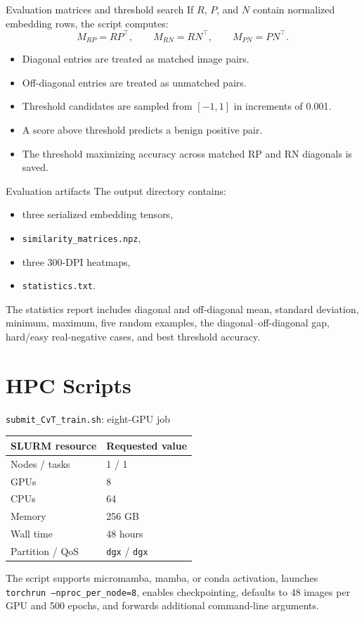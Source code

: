 \documentclass[aspectratio=169,10pt]{beamer}
\newcommand{\file}[1]{\texttt{#1}}
\newcommand{\code}[1]{\texttt{#1}}
\begin{document}
\begin{frame}{Evaluation matrices and threshold search}
  If $R$, $P$, and $N$ contain normalized embedding rows, the script computes:
  \[
    M_{RP}=RP^\top,\qquad
    M_{RN}=RN^\top,\qquad
    M_{PN}=PN^\top.
  \]
  \begin{itemize}
    \item Diagonal entries are treated as matched image pairs.
    \item Off-diagonal entries are treated as unmatched pairs.
    \item Threshold candidates are sampled from $[-1,1]$ in increments of 0.001.
    \item A score above threshold predicts a benign positive pair.
    \item The threshold maximizing accuracy across matched RP and RN diagonals is saved.
  \end{itemize}
\end{frame}

\begin{frame}{Evaluation artifacts}
  The output directory contains:
  \begin{itemize}
    \item three serialized embedding tensors,
    \item \file{similarity\_matrices.npz},
    \item three 300-DPI heatmaps,
    \item \file{statistics.txt}.
  \end{itemize}
  The statistics report includes diagonal and off-diagonal mean, standard
  deviation, minimum, maximum, five random examples, the diagonal--off-diagonal
  gap, hard/easy real-negative cases, and best threshold accuracy.
\end{frame}

\section{HPC Scripts}

\begin{frame}{\file{submit\_CvT\_train.sh}: eight-GPU job}
  \centering
  \begin{tabular}{ll}
    \toprule
    SLURM resource & Requested value\\
    \midrule
    Nodes / tasks & 1 / 1\\
    GPUs & 8\\
    CPUs & 64\\
    Memory & 256 GB\\
    Wall time & 48 hours\\
    Partition / QoS & \code{dgx} / \code{dgx}\\
    \bottomrule
  \end{tabular}
  \vspace{0.7em}
  The script supports micromamba, mamba, or conda activation, launches
  \code{torchrun --nproc\_per\_node=8}, enables checkpointing, defaults to
  48 images per GPU and 500 epochs, and forwards additional command-line arguments.
\end{frame}
\end{document}
